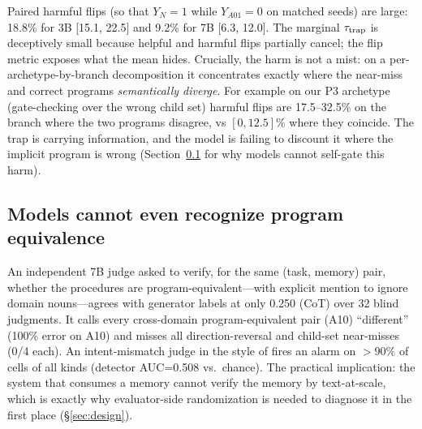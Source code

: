 Paired harmful flips (so that $Y_N{=}1$ while $Y_{A01}{=}0$ on matched seeds) are large: 18.8\% for 3B [15.1, 22.5] and 9.2\% for 7B [6.3, 12.0]. The marginal $\tau_{\mathrm{trap}}$ is deceptively small because helpful and harmful flips partially cancel; the flip metric exposes what the mean hides. Crucially, the harm is not a mist: on a per-archetype-by-branch decomposition it concentrates exactly where the near-miss and correct programs \emph{semantically diverge}. For example on our P3 archetype (gate-checking over the wrong child set) harmful flips are 17.5--32.5\% on the branch where the two programs disagree, vs $[0,12.5]\%$ where they coincide. The trap is carrying information, and the model is failing to discount it where the implicit program is wrong (Section~\ref{ssec:judge} for why models cannot self-gate this harm).

\subsection{Models cannot even recognize program equivalence}
\label{ssec:judge}

An independent 7B judge asked to verify, for the same (task, memory) pair, whether the procedures are program-equivalent---with explicit mention to ignore domain nouns---agrees with generator labels at only 0.250 (CoT) over 32 blind judgments. It calls every cross-domain program-equivalent pair (A10) ``different'' (100\% error on A10) and misses all direction-reversal and child-set near-misses (0/4 each). An intent-mismatch judge in the style of \citet{stitch2026camebench} fires an alarm on $>90\%$ of cells of all kinds (detector AUC=0.508 vs.\ chance). The practical implication: the system that consumes a memory cannot verify the memory by text-at-scale, which is exactly why evaluator-side randomization is needed to diagnose it in the first place (\S\ref{sec:design}).
